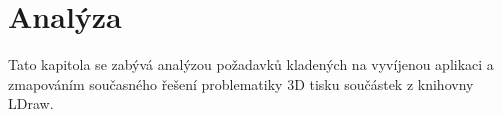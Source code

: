 \chapter{Analýza}
Tato kapitola se zabývá analýzou požadavků kladených na vyvíjenou aplikaci a zmapováním současného řešení problematiky 3D tisku součástek z knihovny LDraw.


